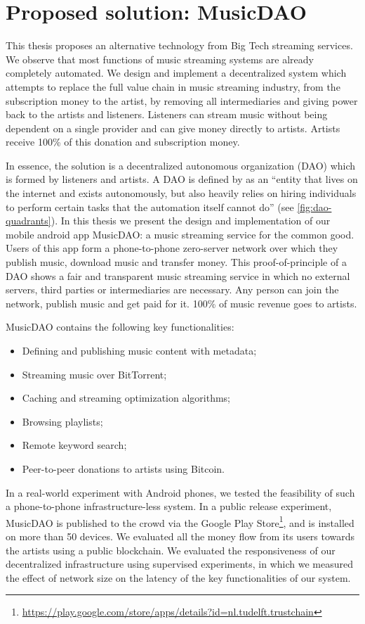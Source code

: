 \section{Proposed solution: MusicDAO}
This thesis proposes an alternative technology from Big Tech streaming services. We observe that most functions of music streaming systems are already completely automated.
We design and implement a decentralized system which attempts to replace the full value chain in music streaming industry, from the subscription money to the artist, by removing all intermediaries and giving power back to the artists and listeners. Listeners can stream music without being dependent on a single provider and can give money directly to artists. Artists receive 100\% of this donation and subscription money.

In essence, the solution is a decentralized autonomous organization (DAO) which is formed by listeners and artists. A DAO is defined by \cite{buterin2014dao} as an ``entity that lives on the internet and exists autonomously, but also heavily relies on hiring individuals to perform certain tasks that the automation itself cannot do'' (see \ref{fig:dao-quadrants}). In this thesis we present the design and implementation of our mobile android app MusicDAO: a music streaming service for the common good. Users of this app form a phone-to-phone zero-server network over which they publish music, download music and transfer money. This proof-of-principle of a DAO shows a fair and transparent music streaming service in which no external servers, third parties or intermediaries are necessary. Any person can join the network, publish music and get paid for it. 100\% of music revenue goes to artists.

MusicDAO contains the following key functionalities:
\begin{itemize}
    \item Defining and publishing music content with metadata;
    \item Streaming music over BitTorrent;
    \item Caching and streaming optimization algorithms;
    \item Browsing playlists;
    \item Remote keyword search;
    \item Peer-to-peer donations to artists using Bitcoin.
\end{itemize}

In a real-world experiment with Android phones, we tested the feasibility of such a phone-to-phone infrastructure-less system. In a public release experiment, MusicDAO is published to the crowd via the Google Play Store\footnote{\url{https://play.google.com/store/apps/details?id=nl.tudelft.trustchain}}, and is installed on more than 50 devices. We evaluated all the money flow from its users towards the artists using a public blockchain. We evaluated the responsiveness of our decentralized infrastructure using supervised experiments, in which we measured the effect of network size on the latency of the key functionalities of our system.

